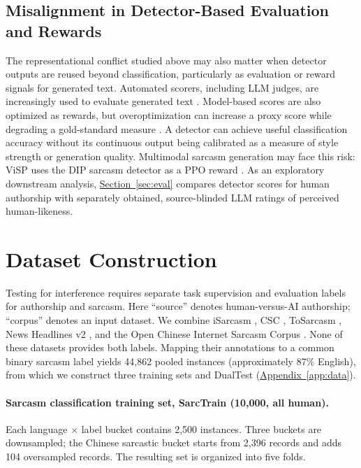 \documentclass[11pt]{article}
\newcommand{\Appref}[1]{\hyperref[#1]{Appendix~\ref*{#1}}}
\begin{document}
\subsection{Misalignment in Detector-Based Evaluation and Rewards}
\label{sec:related-eval}

The representational conflict studied above may also matter when detector outputs are reused beyond classification, particularly as evaluation or reward signals for generated text. Automated scorers, including LLM judges, are increasingly used to evaluate generated text \citep{zheng2023judging}. Model-based scores are also optimized as rewards, but overoptimization can increase a proxy score while degrading a gold-standard measure \citep{gao2023overoptimization}. A detector can achieve useful classification accuracy without its continuous output being calibrated as a measure of style strength or generation quality. Multimodal sarcasm generation may face this risk: ViSP \citep{wang2026visp} uses the DIP sarcasm detector \citep{wen2023dip} as a PPO reward \citep{schulman2017ppo}. As an exploratory downstream analysis, \hyperref[sec:eval]{Section~\ref*{sec:eval}} compares detector scores for human authorship with separately obtained, source-blinded LLM ratings of perceived human-likeness.

\section{Dataset Construction}
\label{sec:data}

Testing for interference requires separate task supervision and evaluation labels for authorship and sarcasm. Here ``source'' denotes human-versus-AI authorship; ``corpus'' denotes an input dataset. We combine iSarcasm \citep{oprea2020isarcasm,abufarha2022isarcasmeval}, CSC \citep{jang2024csc,jang2023intended}, ToSarcasm \citep{liang2022tosarcasm}, News Headlines v2 \citep{misra2023headlines,misra2021sculpting}, and the Open Chinese Internet Sarcasm Corpus \citep{zhu2022corpus}. None of these datasets provides both labels. Mapping their annotations to a common binary sarcasm label yields 44{,}862 pooled instances (approximately 87\% English), from which we construct three training sets and DualTest (\Appref{app:data}).

\paragraph{Sarcasm classification training set, SarcTrain (10{,}000, all human).} Each language $\times$ label bucket contains 2{,}500 instances. Three buckets are downsampled; the Chinese sarcastic bucket starts from 2{,}396 records and adds 104 oversampled records. The resulting set is organized into five folds.
\end{document}
